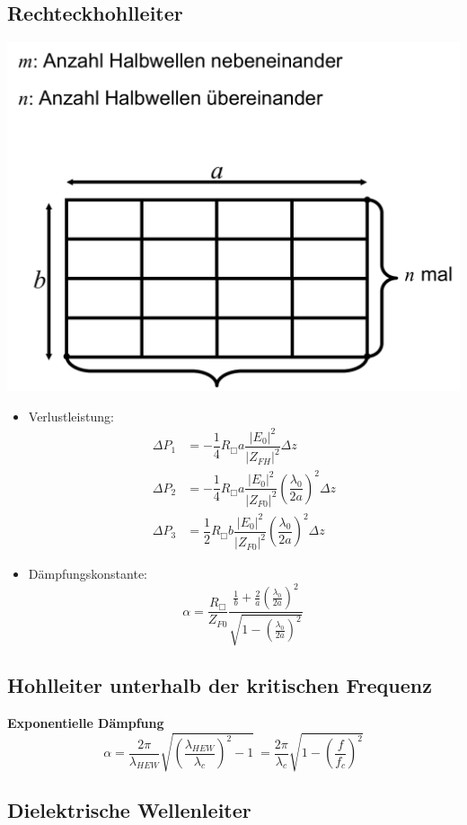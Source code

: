 \subsection{Rechteckhohlleiter}
\includegraphics[width=.35\paperheight]{content/fuw/pictures/fuw_rechteckhohlleiter.png}
\begin{itemize}
    \item Verlustleistung:
        \begin{align*}
            \Delta P_1 &= -\dfrac{1}{4}R_{\Box}a\dfrac{|E_0|^2}{|Z_{FH}|^2}\Delta z\\
            \Delta P_2 &= -\dfrac{1}{4}R_{\Box}a\dfrac{|E_0|^2}{|Z_{F0}|^2} \left(\dfrac{\lambda_0}{2a}\right)^2 \Delta z\\
            \Delta P_3 &= \dfrac{1}{2}R_{\Box}b\dfrac{|E_0|^2}{|Z_{F0}|^2} \left(\dfrac{\lambda_0}{2a}\right)^2 \Delta z
        \end{align*}
    \item Dämpfungskonstante: \[\alpha = \dfrac{R_{\Box}}{Z_{F0}} \dfrac{\frac{1}{b} + \frac{2}{a} \left(\frac{\lambda_0}{2a}\right)^2}{\sqrt{1 - \left(\frac{\lambda_0}{2a}\right)^2}}\
        \]
\end{itemize}
\subsection{Hohlleiter unterhalb der kritischen Frequenz}
\textbf{Exponentielle Dämpfung}
\[\alpha = \dfrac{2\pi}{\lambda_{HEW}} \sqrt{\left(\dfrac{\lambda_{HEW}}{\lambda_c}\right)^2 - 1}\
= \dfrac{2\pi}{\lambda_c} \sqrt{1 - \left(\frac{f}{f_c}\right)^2}\]
\subsection{Dielektrische Wellenleiter}

